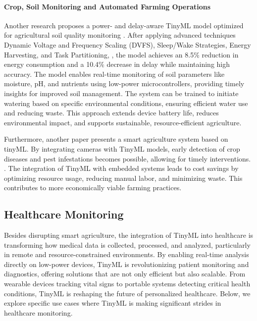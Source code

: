 \documentclass[twocolumn]{article}
\begin{document}
\paragraph{Crop, Soil Monitoring and Automated Farming Operations}

Another research proposes a power- and delay-aware TinyML model optimized for agricultural soil quality monitoring \cite{bhattacharya_deploying_2024}. After applying advanced techniques Dynamic Voltage and Frequency Scaling (DVFS), Sleep/Wake Strategies, Energy Harvesting, and Task Partitioning, , the model achieves an 8.5\% reduction in energy consumption and a 10.4\% decrease in delay while maintaining high accuracy. The model enables real-time monitoring of soil parameters like moisture, pH, and nutrients using low-power microcontrollers, providing timely insights for improved soil management. The system can be trained to initiate watering based on specific environmental conditions, ensuring efficient water use and reducing waste. This approach extends device battery life, reduces environmental impact, and supports sustainable, resource-efficient agriculture. 

Furthermore, another paper presents a smart agriculture system based on tinyML. By integrating cameras with TinyML models, early detection of crop diseases and pest infestations becomes possible, allowing for timely interventions. \cite{tsoukas_tinyml-based_2023}. The integration of TinyML with embedded systems leads to cost savings by optimizing resource usage, reducing manual labor, and minimizing waste. This contributes to more economically viable farming practices.



\subsection{Healthcare Monitoring}

Besides disrupting smart agriculture, the integration of TinyML into healthcare is transforming how medical data is collected, processed, and analyzed, particularly in remote and resource-constrained environments. By enabling real-time analysis directly on low-power devices, TinyML is revolutionizing patient monitoring and diagnostics, offering solutions that are not only efficient but also scalable. From wearable devices tracking vital signs to portable systems detecting critical health conditions, TinyML is reshaping the future of personalized healthcare. Below, we explore specific use cases where TinyML is making significant strides in healthcare monitoring.
\end{document}
